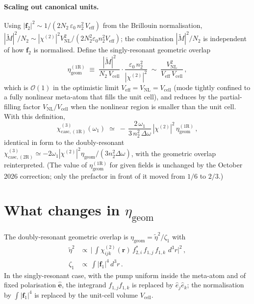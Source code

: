 \documentclass[11pt,a4paper]{article}
\newcommand{\eps}{\varepsilon}
\newcommand{\bvec}[1]{\mathbf{#1}}
\newcommand{\f}{\bvec{f}}
\newcommand{\ri}{\bvec{r}}
\newcommand{\dthreer}{\,d^{3}r}
\newcommand{\chitwo}{\chi^{(2)}}
\newcommand{\Dom}{\Delta\omega}
\newcommand{\chicascOneR}{\chi^{(3)}_{\text{casc},(1\mathrm R)}}
\newcommand{\chicascTwoR}{\chi^{(3)}_{\text{casc},(2\mathrm R)}}
\newcommand{\Vunit}{V_{\text{cell}}}
\newcommand{\VNL}{V_{\text{NL}}}
\newcommand{\Veff}{V_{\text{eff}}}
\begin{document}
\paragraph{Scaling out canonical units.}
Using $|\f_2|^{2}\sim 1/(2N_2\,\eps_0\,n_2^{2}\,\Veff)$ from the Brillouin
normalisation, $|\widetilde M|^{2}/N_2\sim|\chitwo|^{2}\VNL^{2}/(2N_2^2\eps_0 n_2^{2}\Veff)$;
the combination $|\widetilde M|^2/N_2$ is independent of how $\f_2$ is
normalised.  Define the singly-resonant geometric overlap
\begin{equation}
  \eta_\text{geom}^{(1\mathrm R)}
   \;\equiv\;\frac{|\widetilde M|^{2}}{N_2\,\Vunit}
              \cdot\frac{\eps_0\,n_2^{2}}{|\chitwo|^{2}}
   \;\sim\;\frac{\VNL^{2}}{\Veff\,\Vunit}\,,
  \label{eq:eta-1R-def}
\end{equation}
which is $\mathcal O(1)$ in the optimistic limit $\Veff=\VNL=\Vunit$ (mode
tightly confined to a fully nonlinear meta-atom that fills the unit
cell), and reduces by the partial-filling factor $\VNL/\Vunit$ when the
nonlinear region is smaller than the unit cell.  With this definition,
\begin{equation}
  \boxed{\;\chicascOneR(\omega_1)\;\simeq\;
        -\,\frac{2\,\omega_1}{3\,n_2^{2}\,\Dom}\,|\chitwo|^{2}\,
        \eta_\text{geom}^{(1\mathrm R)}\,,\;}
  \label{eq:chi3-1R-explicit}
\end{equation}
identical in form to the doubly-resonant
$\chicascTwoR\simeq
-2\omega_1|\chitwo|^{2}\eta_\text{geom}/(3 n_2^{2}\Dom)$, with the
geometric overlap reinterpreted.  (The value of
$\eta_\text{geom}^{(1\mathrm R)}$ for given fields is unchanged by the
October 2026 correction; only the prefactor in front of it moved from
$1/6$ to $2/3$.)

\section{What changes in $\eta_\text{geom}$}\label{sec:eta-compare}

The doubly-resonant geometric overlap is
$\eta_\text{geom}=\widetilde\eta^{2}/\zeta_1$ with
\begin{align}
  \widetilde\eta^{2}
   &\propto\,\bigl|\,{\textstyle\int}\chitwo_{ijk}(\ri)\,
                       f_{2,i}^{*}\,f_{1,j}\,f_{1,k}\,\dthreer\bigr|^{2}\,,
   \\[2pt]
  \zeta_1
   &\propto\,{\textstyle\int}|\f_1|^{4}\dthreer\,.
\end{align}
In the singly-resonant case, with the pump uniform inside the meta-atom and
of fixed polarisation $\hat{\bm e}$, the integrand $f_{1,j}f_{1,k}$ is
replaced by $\hat e_j\hat e_k$; the normalisation by $\int|\f_1|^{4}$ is
replaced by the unit-cell volume $\Vunit$.
\end{document}
